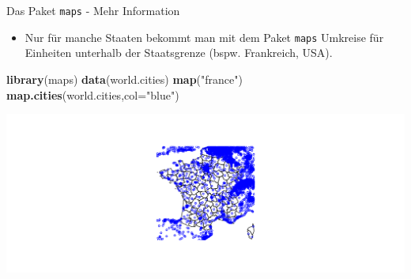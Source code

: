\documentclass[ignorenonframetext,]{beamer}
\newenvironment{Shaded}{\begin{snugshade}}{\end{snugshade}}
\newcommand{\DataTypeTok}[1]{\textcolor[rgb]{0.13,0.29,0.53}{#1}}
\newcommand{\KeywordTok}[1]{\textcolor[rgb]{0.13,0.29,0.53}{\textbf{#1}}}
\newcommand{\NormalTok}[1]{#1}
\newcommand{\StringTok}[1]{\textcolor[rgb]{0.31,0.60,0.02}{#1}}
\providecommand{\tightlist}{%
  \setlength{\itemsep}{0pt}\setlength{\parskip}{0pt}}
\begin{document}
\begin{frame}[fragile]{Das Paket \texttt{maps} - Mehr Information}
\protect\hypertarget{das-paket-maps---mehr-information}{}

\begin{itemize}
\tightlist
\item
  Nur für manche Staaten bekommt man mit dem Paket \texttt{maps}
  Umkreise für Einheiten unterhalb der Staatsgrenze (bspw. Frankreich,
  USA).
\end{itemize}

\begin{Shaded}
\begin{Highlighting}[]
\KeywordTok{library}\NormalTok{(maps)}
\KeywordTok{data}\NormalTok{(world.cities)}
\KeywordTok{map}\NormalTok{(}\StringTok{"france"}\NormalTok{)}
\KeywordTok{map.cities}\NormalTok{(world.cities,}\DataTypeTok{col=}\StringTok{"blue"}\NormalTok{)}
\end{Highlighting}
\end{Shaded}

\includegraphics{A6_Shapefiles_files/figure-beamer/unnamed-chunk-41-1.pdf}

\end{frame}
\end{document}
